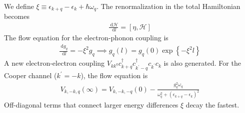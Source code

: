 \documentclass[twoside,11pt]{report}
\numberwithin{equation}{section}
\begin{document}
We define \(\xi \equiv \epsilon_{k+q} - \epsilon_k + \hbar\omega_q\). The renormalization in the total Hamiltonian becomes
\begin{equation}\begin{aligned}
	\frac{\:\mathrm{d}\mathcal{H}}{\:\mathrm{d}l} = \left[\eta,\mathcal{H}\right]
\end{aligned}\end{equation}
The flow equation for the electron-phonon coupling is
\begin{equation}\begin{aligned}
	\frac{\:\mathrm{d}g_q}{\:\mathrm{d}l} = -\xi^2g_q \implies g_q(l) = g_q(0)\exp\left\{-\xi^2 l\right\} 
\end{aligned}\end{equation}
A new electron-electron coupling \(V_{kk^ q}c^\dagger_{k+q}c^\dagger_{k^\prime -q}c_{k^\prime}c_k\) is also generated. For the Cooper channel (\(k^\prime = -k\)), the flow equation is
\begin{equation}\begin{aligned}
	V_{k,-k,q}(\infty) = V_{k,-k,-q}(0) - \frac{g_q^2\omega_q}{\omega_q^2 + \left(\epsilon_{k+q} - \epsilon_k\right)^2}
\end{aligned}\end{equation}
Off-diagonal terms that connect larger energy differences \(\xi\) decay the fastest.
\end{document}
